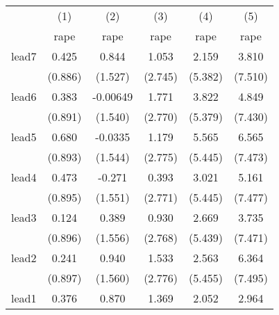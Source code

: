 {
\def\sym#1{\ifmmode^{#1}\else\(^{#1}\)\fi}
\begin{tabular}{l*{5}{c}}
\hline\hline
            &\multicolumn{1}{c}{(1)}&\multicolumn{1}{c}{(2)}&\multicolumn{1}{c}{(3)}&\multicolumn{1}{c}{(4)}&\multicolumn{1}{c}{(5)}\\
            &\multicolumn{1}{c}{rape}&\multicolumn{1}{c}{rape}&\multicolumn{1}{c}{rape}&\multicolumn{1}{c}{rape}&\multicolumn{1}{c}{rape}\\
\hline
lead7       &       0.425         &       0.844         &       1.053         &       2.159         &       3.810         \\
            &     (0.886)         &     (1.527)         &     (2.745)         &     (5.382)         &     (7.510)         \\
[1em]
lead6       &       0.383         &    -0.00649         &       1.771         &       3.822         &       4.849         \\
            &     (0.891)         &     (1.540)         &     (2.770)         &     (5.379)         &     (7.430)         \\
[1em]
lead5       &       0.680         &     -0.0335         &       1.179         &       5.565         &       6.565         \\
            &     (0.893)         &     (1.544)         &     (2.775)         &     (5.445)         &     (7.473)         \\
[1em]
lead4       &       0.473         &      -0.271         &       0.393         &       3.021         &       5.161         \\
            &     (0.895)         &     (1.551)         &     (2.771)         &     (5.445)         &     (7.477)         \\
[1em]
lead3       &       0.124         &       0.389         &       0.930         &       2.669         &       3.735         \\
            &     (0.896)         &     (1.556)         &     (2.768)         &     (5.439)         &     (7.471)         \\
[1em]
lead2       &       0.241         &       0.940         &       1.533         &       2.563         &       6.364         \\
            &     (0.897)         &     (1.560)         &     (2.776)         &     (5.455)         &     (7.495)         \\
[1em]
lead1       &       0.376         &       0.870         &       1.369         &       2.052         &       2.964         \\

\end{tabular}}
